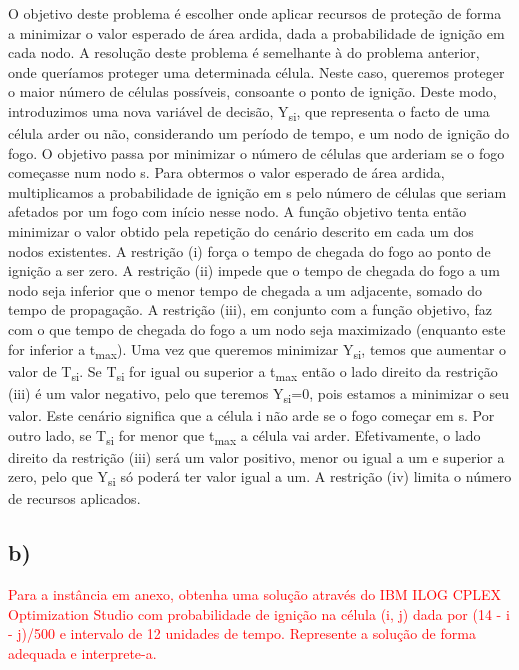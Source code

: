 \documentclass[11pt]{article} %
\begin{document}
O objetivo deste problema é escolher onde aplicar recursos de proteção de forma a minimizar o valor esperado de área ardida, dada a probabilidade de ignição em cada nodo. A resolução deste problema é semelhante à do problema anterior, onde queríamos proteger uma determinada célula. Neste caso, queremos proteger o maior número de células possíveis, consoante o ponto de ignição. Deste modo, introduzimos uma nova variável de decisão, Y\textsubscript{si}, que representa o facto de uma célula arder ou não, considerando um período de tempo, e um nodo de ignição do fogo. O objetivo passa por minimizar  o número de células que arderiam se o fogo começasse num nodo s.
Para obtermos o valor esperado de área ardida, multiplicamos a probabilidade de ignição em s pelo número de células que seriam afetados por um fogo com início nesse nodo. A função objetivo tenta então minimizar o valor obtido pela repetição do cenário descrito em cada um dos nodos existentes. A restrição (i) força o tempo de chegada do fogo ao ponto de ignição a ser zero. A restrição (ii) impede que o tempo de chegada do fogo a um nodo seja inferior que o menor tempo de chegada a um adjacente, somado do tempo de propagação. A restrição (iii), em conjunto com a função objetivo, faz com o que tempo de chegada do fogo a um nodo seja maximizado (enquanto este for inferior a t\textsubscript{max}). Uma vez que queremos minimizar Y\textsubscript{si}, temos que aumentar o valor de T\textsubscript{si}. Se  T\textsubscript{si} for igual ou superior a t\textsubscript{max} então o lado direito da restrição (iii) é um valor negativo, pelo que teremos Y\textsubscript{si}=0, pois estamos a minimizar o seu valor. Este cenário significa que a célula i não arde se o fogo começar em s. Por outro lado, se T\textsubscript{si} for menor que  t\textsubscript{max} a célula vai arder. Efetivamente, o lado direito da restrição (iii) será um valor positivo, menor ou igual a um e superior a zero, pelo que Y\textsubscript{si} só poderá ter valor igual a um. A restrição (iv) limita o número de recursos aplicados.
\subsection*{b)}
\textcolor{red}{Para a instância em anexo, obtenha uma solução através do IBM ILOG CPLEX
Optimization Studio com probabilidade de ignição na célula (i, j) dada por (14 - i -
j)/500 e intervalo de 12 unidades de tempo. Represente a solução de forma adequada
e interprete-a.}
\end{document}
